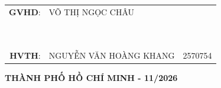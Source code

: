 \begin{titlepage}
\begin{table}[h]
{\begin{tabular}{rll}
\textbf{GVHD}:& VÕ THỊ NGỌC CHÂU & \\
 ~~\\~~\\
\textbf{HVTH}:& NGUYỄN VĂN HOÀNG KHANG & 2570754\\
\end{tabular}
}
\end{table}



\vfill
\begin{center}
{\footnotesize {\fontsize{15pt}{15pt}\selectfont \textbf{THÀNH PHỐ HỒ CHÍ MINH - 11/2026}}}
\end{center}
\end{titlepage}